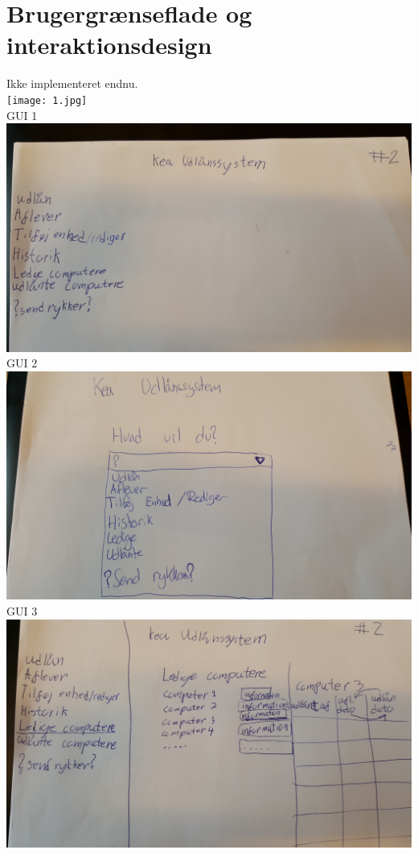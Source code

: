 \documentclass[a4paper]{article}
\begin{document}
\section{Brugergrænseflade og interaktionsdesign}
Ikke implementeret endnu.\\
\texttt{[image: 1.jpg]}\\
GUI 1\\
\includegraphics[scale=0.07]{4.jpg}\\
GUI 2\\
\includegraphics[scale=0.07]{5.jpg}\\
GUI 3\\
\includegraphics[scale=0.07]{6.jpg}\\
\end{document}
